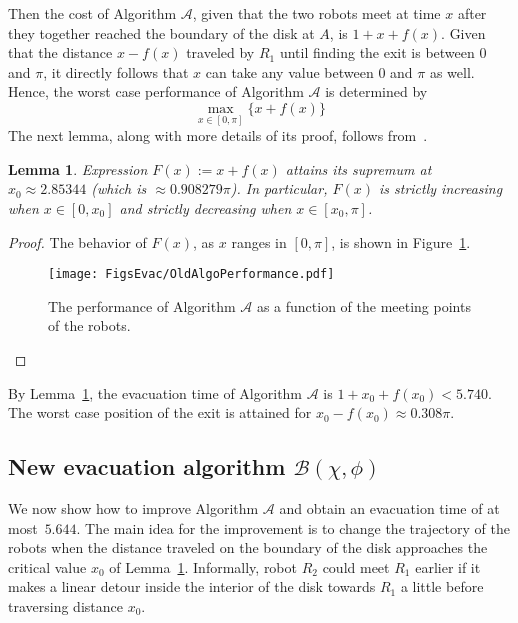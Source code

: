 \documentclass[
final
]{dmtcs-episciences}
\newcommand{\RA}{\ensuremath{R_1}}
\newcommand{\RB}{\ensuremath{R_2 }}
\newtheorem{lemma}[theorem]{Lemma}
\theoremstyle{definition}
\begin{document}
Then the cost of Algorithm $\mathcal A$, given that the two robots meet at time $x$ after they together reached the boundary of the disk at $A$, is $1+x+f(x)$. Given that the distance $x-f(x)$ traveled by $\RA$ until finding the exit is between $0$ and $\pi$, it directly follows that $x$ can take any value between $0$ and $\pi$ as well. Hence, the worst case performance of Algorithm $\mathcal A$ is determined by
$$
\max_{x\in [0,\pi]} \{ x+f(x) \} 
$$
The next lemma, along with more details of its proof, follows from~\cite{CGGKMP}.
\begin{lemma}\label{lem: monotonicity of x+f(x)}
Expression $F(x):=x+f(x)$ attains its supremum at $x_0 \approx 2.85344$
(which is $ \approx 0.908279 \pi$). In particular, $F(x)$ is strictly increasing when $x \in [0, x_0]$ and strictly decreasing when $x \in [x_0, \pi]$.
\end{lemma}

\begin{proof}
The behavior of $F(x)$, as $x$ ranges in $[0,\pi]$, is shown in Figure~\ref{fig: performance old-algo}.
\begin{figure}[!ht]
                \centering
                \texttt{[image: FigsEvac/OldAlgoPerformance.pdf]}
                \caption{The performance of Algorithm $\mathcal A$ as a function of the meeting points of the robots.}
                \label{fig: performance old-algo}
\end{figure}
\end{proof}

By Lemma~\ref{lem: monotonicity of x+f(x)}, the evacuation time of Algorithm $\mathcal A$ is $1+x_0+f(x_0) < 5.740$. The worst case position of the exit is attained for $x_0-f(x_0) \approx 0.308 \pi$. 





\subsection{New evacuation algorithm \texorpdfstring{$\mathcal B(\chi, \phi)$}{Lg}}


We now show how to improve Algorithm $\mathcal A$ and obtain an evacuation time of at most~$5.644$.
The main idea for the improvement is to change the trajectory of the robots when the distance traveled on the boundary of the disk approaches the critical value $x_0$ of Lemma~\ref{lem: monotonicity of x+f(x)}. Informally, 
robot $\RB$ could meet $\RA$ earlier if it makes a linear detour inside the interior of 
the disk towards $\RA$ a little before traversing distance $x_0$. 
\end{document}
